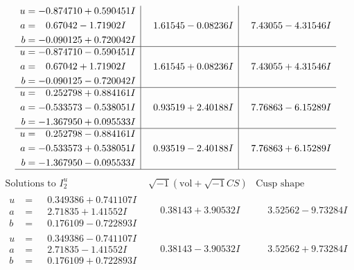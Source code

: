\documentclass[1p]{elsarticle_modified}
\theoremstyle{definition}
\newcommand{\I}{\sqrt{-1}}
\begin{document}
$$\begin{array}{c|c|c}
\begin{aligned}
u &= -0.874710 + 0.590451 I \\
a &= \phantom{-}0.67042 - 1.71902 I \\
b &= -0.090125 + 0.720042 I\end{aligned}
 & \phantom{-}1.61545 - 0.08236 I & \phantom{-}7.43055 - 4.31546 I \\ \hline\begin{aligned}
u &= -0.874710 - 0.590451 I \\
a &= \phantom{-}0.67042 + 1.71902 I \\
b &= -0.090125 - 0.720042 I\end{aligned}
 & \phantom{-}1.61545 + 0.08236 I & \phantom{-}7.43055 + 4.31546 I \\ \hline\begin{aligned}
u &= \phantom{-}0.252798 + 0.884161 I \\
a &= -0.533573 - 0.538051 I \\
b &= -1.367950 + 0.095533 I\end{aligned}
 & \phantom{-}0.93519 + 2.40188 I & \phantom{-}7.76863 - 6.15289 I \\ \hline\begin{aligned}
u &= \phantom{-}0.252798 - 0.884161 I \\
a &= -0.533573 + 0.538051 I \\
b &= -1.367950 - 0.095533 I\end{aligned}
 & \phantom{-}0.93519 - 2.40188 I & \phantom{-}7.76863 + 6.15289 I\\
 \hline 
 \end{array}$$\newpage$$\begin{array}{c|c|c}  
\text{Solutions to }I^u_{2}& \I (\text{vol} + \sqrt{-1}CS) & \text{Cusp shape}\\
 \hline 
\begin{aligned}
u &= \phantom{-}0.349386 + 0.741107 I \\
a &= \phantom{-}2.71835 + 1.41552 I \\
b &= \phantom{-}0.176109 - 0.722893 I\end{aligned}
 & \phantom{-}0.38143 + 3.90532 I & \phantom{-}3.52562 - 9.73284 I \\ \hline\begin{aligned}
u &= \phantom{-}0.349386 - 0.741107 I \\
a &= \phantom{-}2.71835 - 1.41552 I \\
b &= \phantom{-}0.176109 + 0.722893 I\end{aligned}
 & \phantom{-}0.38143 - 3.90532 I & \phantom{-}3.52562 + 9.73284 I \\ \hline\begin{aligned}

\end{aligned}
\end{array}$$
\end{document}
